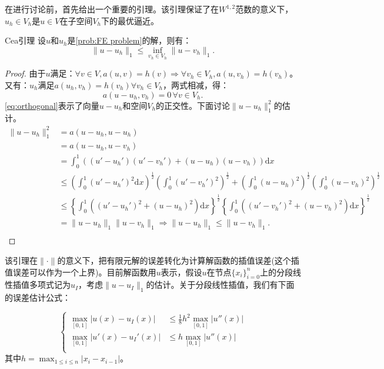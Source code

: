 \documentclass[lang=cn,10pt,newtx]{elegantbook}
\newcommand{\dif}{\mathrm{d}}
\newcommand{\norm}[1]{\|#1\|}
\begin{document}
在进行讨论前，首先给出一个重要的引理。该引理保证了在$W^{1,2}$范数的意义下，$u_{h}\in V_{h}$是$u\in V$在子空间$V_{h}$下的最优逼近。
\begin{lemma}{Cea引理}
  \label{lem:cea}
  设$u$和$u_{h}$是\ref{prob:FE problem}的解，则有：
  \begin{equation}
    \label{eq:cea}
    \norm{u-u_{h}}_{1}\le\inf_{v_{h}\in V_{h}}\norm{u-v_{h}}_{1}.
  \end{equation}
\end{lemma}
\begin{proof}
  由于$u$满足：$\forall v\in V, a(u,v)=h(v)\Rightarrow\forall v_{h}\in V_{h},a(u,v_{h})=h(v_{h})$。又有：$u_{h}$满足$a(u_{h},v_{h})=h(v_{h})\forall v_{h}\in V_{h}$，两式相减，得：
  \begin{equation}
    \label{eq:orthogonal}
    a(u-u_{h},v_{h})=0\,\forall v\in V_{h}.
  \end{equation}
  \eqref{eq:orthogonal}表示了向量$u-u_{h}$和空间$V_{h}$的正交性。下面讨论$\norm{u-u_{h}}_{1}^{2}$的估计。
  \begin{equation}
    \label{eq:estimateError}
    \begin{aligned}
    \norm{u-u_{h}}_{1}^{2}&=a(u-u_{h},u-u_{h})\\
    &=a(u-u_{h},u-v_{h})\\
    &=\int_{0}^{1}((u'-u_{h}')(u'-v_{h}')+(u-u_{h})(u-v_{h}))\dif x\\
    &\le\left(\int_{0}^{1}(u'-u_{h}')^{2}\dif x\right)^{\frac{1}{2}}\left(\int_{0}^{1}(u'-v_{h}')^{2}\right)^{\frac{1}{2}}+\left(\int_{0}^{1}(u-u_{h})^{2}\right)^{\frac{1}{2}}\left(\int_{0}^{1}(u-v_{h})^2\right)^{\frac{1}{2}}\\
    &\le\left\{\int_{0}^{1}\left((u'-u_{h}')^{2}+(u-u_{h})^{2}\right)\dif x\right\}^{\frac{1}{2}}\left\{\int_{0}^{1}\left((u'-v_{h}')^2+(u-v_{h})^{2}\right)\dif x\right\}^{\frac{1}{2}}\\
    &=\norm{u-u_{h}}_{1}\norm{u-v_{h}}_{1}\Rightarrow\norm{u-u_{h}}_{1}\le\norm{u-v_{h}}_{1}.\\
    \end{aligned}
  \end{equation}
\end{proof}
该引理在$\norm{\cdot}$的意义下，把有限元解的误差转化为计算解函数的插值误差(这个插值误差可以作为一个上界)。目前解函数用$u$表示，假设$u$在节点$\{x_{i}\}_{i=0}^{n}$上的分段线性插值多项式记为$u_{I}$，考虑$\norm{u-u_{I}}_{1}$的估计。关于分段线性插值，我们有下面的误差估计公式：
\begin{theorem}
  \label{thm:interperror}
  \begin{equation}
    \left\{
      \begin{aligned}
        \max_{[0,1]}|u(x)-u_{I}(x)|&\le\frac{1}{8}h^2\max_{[0,1]}|u''(x)|\\
        \max_{[0,1]}|u'(x)-u_{I}'(x)|&\le h\max_{[0,1]}|u''(x)|\\
      \end{aligned}
    \right.
  \end{equation}
  其中$h=\max_{1\le i\le n}|x_{i}-x_{i-1}|$。
\end{theorem}
\end{document}

